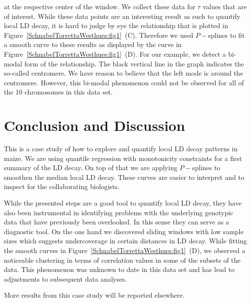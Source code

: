 \documentclass[twoside]{report}
\begin{document}
	at the respective center of the window. We collect these data for  
	$\tau$ values that are of interest. While these data points are an interesting result as
	such to quantify local LD decay, it is hard to judge by eye the relationship that is plotted in 
	Figure~\ref{SchnabelTorrettaWesthues:fig1}~(C). 
	Therefore we used $P-$splines to fit a smooth curve to these results as 
	displayed by the curve in Figure~\ref{SchnabelTorrettaWesthues:fig1}~(D). 
	For our example, we detect a bi-modal form of the 
	relationship. The black vertical line in the graph indicates the so-called centromere. 
	We have reason to believe that the left mode is around the centromere.   
	However, this bi-modal phenomenon could not be observed for 
	all of the 10 chromosomes in this data set.   

\section{Conclusion and Discussion}
This is a case study of how to explore and quantify local LD decay patterns in maize. We are using
quantile regression with monotonicity constraints for a first summary of the LD decay. 
On top of that we are applying $P-$splines to smoothen the median local LD decay. These curves 
are easier to interpret and to inspect for the collaborating biologists. 

While the presented steps are a good tool to quantify local LD decay, they have also been 
	instrumental in identifying problems with the underlying genotypic 
	data that have previously been 
	overlooked. In this sense they can serve as a diagnostic tool. 
	On the one hand we discovered sliding windows with low sample sizes which suggests 
	undercoverage in certain distances in LD decay. 
	While fitting the smooth curves in Figure~\ref{SchnabelTorrettaWesthues:fig1}~(D), we 
	observed a noticeable clustering 
	in terms of correlation values in some of the subsets of the data. This phenomenon was unknown 
	to date in this data set and has lead to adjustments to subsequent data analyses. 
	
More results from this case study will be reported elsewhere.
\end{document}

